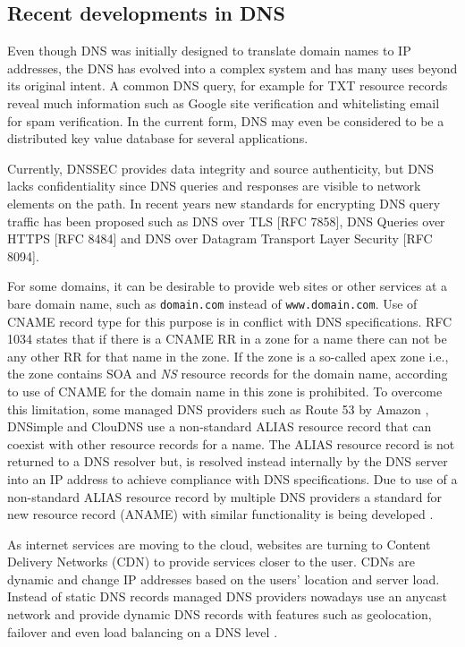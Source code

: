 \subsection{Recent developments in DNS}

Even though DNS was initially designed to translate domain names to IP addresses, the DNS has evolved into a complex system and has many uses beyond its original intent. A common DNS query, for example for \textsf{TXT} resource records reveal much information such as Google site verification and whitelisting email for spam verification. In the current form, DNS may even be considered to be a distributed key value database for several applications.

Currently, DNSSEC provides data integrity and source authenticity, but DNS lacks confidentiality since DNS queries and responses are visible to network elements on the path. In recent years new standards for encrypting DNS query traffic has been proposed such as \textsf{DNS over TLS} [RFC 7858], \textsf{DNS Queries over HTTPS} [RFC 8484] and \textsf{DNS over Datagram Transport Layer Security} [RFC 8094]. 

For some domains, it can be desirable to provide web sites or other services at a bare domain name, such as \texttt{domain.com} instead of \texttt{www.domain.com}. Use of CNAME record type for this purpose is in conflict with DNS specifications. RFC 1034 \cite{RFC1034} states that if there is a CNAME RR in a zone for a name there can not be any other RR for that name in the zone. If the zone is a so-called apex zone i.e., the zone contains \textsf{SOA} and \textsl{NS} resource records for the domain name, according to \cite{RFC1034} use of CNAME for the domain name in this zone is prohibited. To overcome this limitation, some managed DNS providers such as Route 53 by Amazon \cite{Route53}, DNSimple \cite{DNSimple} and ClouDNS \cite{ClouDNS} use a non-standard \textsf{ALIAS} resource record that can coexist with other resource records for a name. The ALIAS resource record is not returned to a DNS resolver but, is resolved instead internally by the DNS server into an IP address to achieve compliance with DNS specifications. Due to use of a non-standard ALIAS resource record by multiple DNS providers a standard for new resource record (\textsf{ANAME}) with similar functionality is being developed \cite{ANAME}.

As internet services are moving to the cloud, websites are turning to Content Delivery Networks (CDN) to provide services closer to the user. CDNs are dynamic and change IP addresses based on the users' location and server load. Instead of static DNS records managed DNS providers nowadays use an anycast network and provide dynamic DNS records with features such as geolocation, failover and even load balancing on a DNS level \cite{ManagedDNS}.

